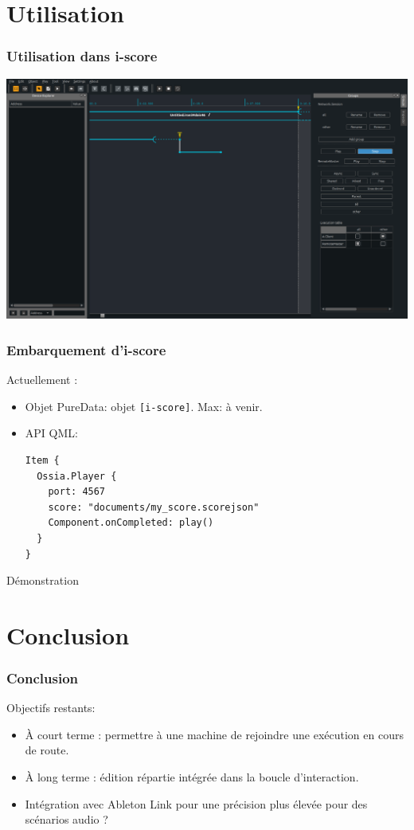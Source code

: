 \documentclass[handout]{beamer}
\begin{document}
\section{Utilisation}
\begin{frame}
\frametitle{Utilisation dans i-score}
\centering
\includegraphics[width=\textwidth]{images/score.png}
\end{frame}

\begin{frame}[fragile]
\frametitle{Embarquement d'i-score}
Actuellement : 
\begin{itemize}
    \item Objet PureData: objet \lstinline|[i-score]|. Max: à venir.
    \item API QML:
    \begin{lstlisting}
Item {
  Ossia.Player {
    port: 4567
    score: "documents/my_score.scorejson"
    Component.onCompleted: play()
  }
}
    \end{lstlisting}
\end{itemize}
\end{frame}

\begin{frame}
\Huge
\centering
Démonstration
\end{frame}


\section{Conclusion}
\begin{frame}
    \frametitle{Conclusion}  
    \Large
    Objectifs restants:
    \begin{itemize}
        \item<1> À court terme : permettre à une machine de rejoindre une exécution en cours de route.
        \item<2> À long terme : édition répartie intégrée dans la boucle d'interaction.
        \item<3> Intégration avec Ableton Link pour une précision plus élevée pour des scénarios audio ?
    \end{itemize}
\end{frame}
\end{document}
